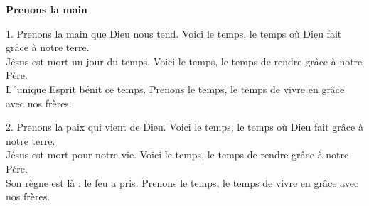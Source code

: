 \textbf{Prenons la main}

1. Prenons la main que Dieu nous tend.
Voici le temps, le temps où Dieu fait grâce à notre terre.\\
Jésus est mort un jour du temps.
Voici le temps, le temps de rendre grâce à notre Père.\\
L´unique Esprit bénit ce temps.
Prenons le temps, le temps de vivre en grâce avec nos frères.

2. Prenons la paix qui vient de Dieu.
Voici le temps, le temps où Dieu fait grâce à notre terre.\\
Jésus est mort pour notre vie.
Voici le temps, le temps de rendre grâce à notre Père.\\
Son règne est là : le feu a pris.
Prenons le temps, le temps de vivre en grâce avec nos frères.

